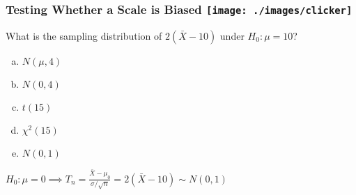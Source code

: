 \begin{frame}[t]

	\frametitle{Testing Whether a Scale is Biased \hfill \texttt{[image: ./images/clicker]}}

	\vspace{2em}

	What is the sampling distribution of $2(\bar{X}-10)$ under $H_0\colon \mu = 10$? 

	\vspace{1em}

	\begin{enumerate}[(a)]
		\item $N(\mu, 4)$  
		\item $N(0, 4)$  
		\item $t(15)$  
		\item $\chi^2(15)$  
		\item $N(0,1)$  
	\end{enumerate}

	\pause
	\alert{$H_0\colon \mu = 0 \implies \displaystyle T_n = \frac{\bar{X} - \mu_0}{\sigma/\sqrt{n}} =  2(\bar{X} - 10)\sim N(0,1)$}
\end{frame}

